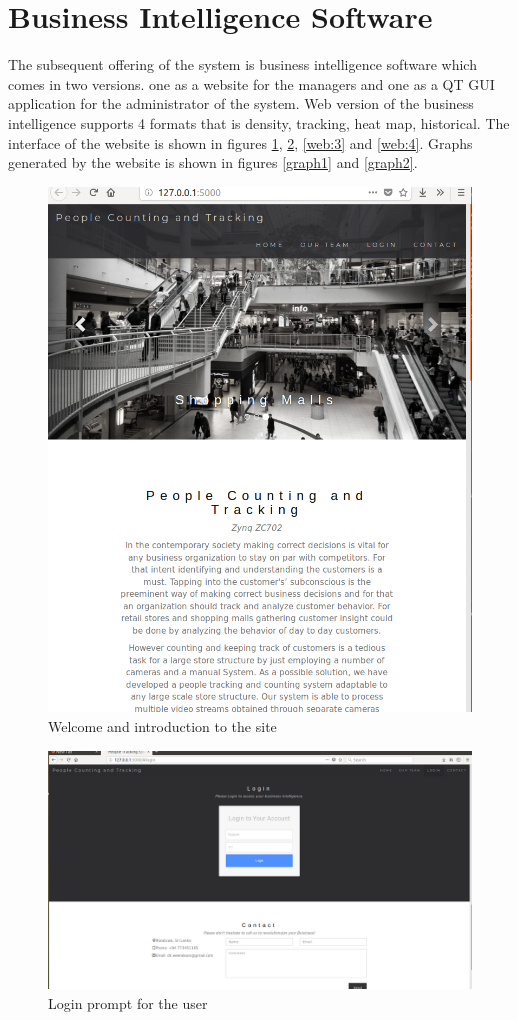 \documentclass[12pt,a4paper]{report}
\begin{document}
\section{Business Intelligence Software}
The subsequent offering of the system is business intelligence software which comes in two versions.  one as a website for the managers and one as a QT GUI application for the administrator of the system. 
Web version of the business intelligence supports 4 formats that is density, tracking, heat map, historical. The interface of the website is shown in figures \ref{web:1}, \ref{web:2}, \ref{web:3} and \ref{web:4}. Graphs generated by the website is shown in figures \ref{graph1} and \ref{graph2}.


\begin{figure}[H]
  \centering
  \includegraphics[width=.8\linewidth]{web1}
  \caption{Welcome and introduction to the site}
  \label{web:1}
\end{figure}
\begin{figure}[H]
  \centering
  \includegraphics[width=.8\linewidth]{web2}
  \caption{Login prompt for the user}
  \label{web:2}
\end{figure}
\end{document}
